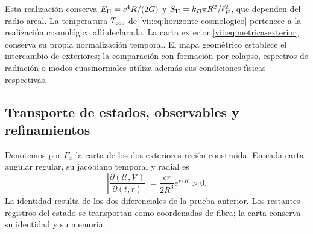 Esta realización conserva
\(E_{\rm H}=c^4R/(2G)\) y
\(S_{\rm H}=k_B\pi R^2/\ell_P^2\), que dependen del radio areal.
La temperatura \(T_{\rm cos}\) de
\eqref{vii:eq:horizonte-cosmologico} pertenece a la realización
cosmológica allí declarada. La carta exterior
\eqref{vii:eq:metrica-exterior} conserva su propia normalización temporal.
El mapa geométrico establece el intercambio de exteriores; la comparación
con formación por colapso, espectros de radiación o modos cuasinormales
utiliza además sus condiciones físicas respectivas.

\subsection{Transporte de estados, observables y refinamientos}
\label{vii:subsec:transporte-informacion-horizonte}

Denotemos por \(F_x\) la carta de los dos exteriores recién construida.
En cada carta angular regular, su jacobiano temporal y radial es
\begin{equation}
 \left|\frac{\partial(\mathcal U,\mathcal V)}{\partial(t,r)}\right|
 =\frac{cr}{2R^3}e^{r/R}>0.
 \label{vii:eq:jacobiano-kruskal}
\end{equation}
La identidad resulta de los dos diferenciales de la prueba anterior.
Los restantes registros del estado se transportan como coordenadas de
fibra; la carta conserva su identidad y su memoria.

